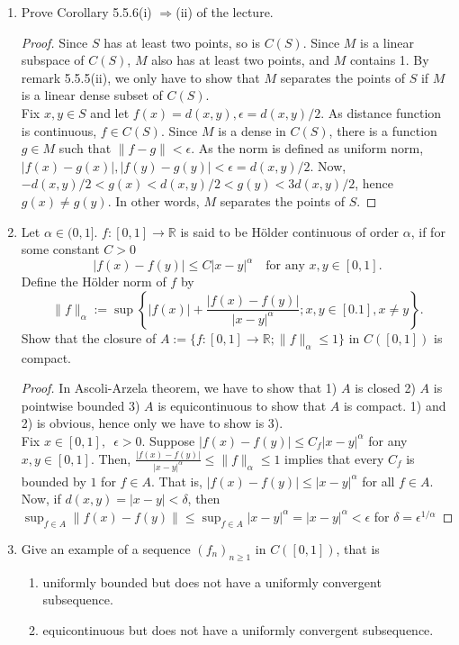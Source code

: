 \documentclass{article}
\begin{document}
\begin{enumerate}[font = \Large\bfseries\itshape\space, leftmargin = 3mm, labelsep = 3mm]
\item
Prove Corollary 5.5.6(i) $\Rightarrow$(ii) of the lecture.
\begin{proof}
Since $S$ has at least two points, so is $C(S)$.
Since $M$ is a linear subspace of $C(S)$, $M$ also has at least two points, and $M$ contains 1.
By remark 5.5.5(ii), we only have to show that $M$ separates the points of $S$ if $M$ is a linear dense subset of $C(S)$.\\
Fix $x,y \in S$ and let $f(x) = d(x,y), \epsilon = d(x,y)/2$.
As distance function is continuous, $f \in C(S)$.
Since $M$ is a dense in $C(S)$, there is a function $g \in M$ such that $\|f-g\| < \epsilon$.
As the norm is defined as uniform norm, $|f(x) - g(x)|, |f(y) - g(y)| < \epsilon = d(x,y) /2$.
Now, $-d(x,y)/2 < g(x) < d(x,y)/2 < g(y) < 3d(x,y)/2$, hence $g(x) \neq g(y)$.
In other words, $M$ separates the points of $S$.
\end{proof}

\item
Let $\alpha \in (0,1]$.
$f : [0,1] \rightarrow \mathbb{R}$ is said to be H\"older continuous of order $\alpha$, if for some constant $C > 0$
$$|f(x)-f(y)| \leq C|x-y|^\alpha \quad \text{for any } x,y \in [0,1].$$
Define the H\"older norm of $f$ by
$$\|f\|_\alpha := \sup \left\{ |f(x)| + \frac{|f(x)-f(y)|}{|x-y|^\alpha}; x,y \in [0.1], x\neq y \right\}.$$
Show that the closure of $A := \{ f : [0,1] \rightarrow \mathbb{R}; \|f\|_\alpha \leq 1\}$ in $C([0,1])$ is compact.
\begin{proof}
In Ascoli-Arzela theorem, we have to show that 1) $A$ is closed 2) $A$ is pointwise bounded 3) $A$ is equicontinuous to show that $A$ is compact.
1) and 2) is obvious, hence only we have to show is 3).\\
Fix $x \in [0,1],\enspace \epsilon > 0$.
Suppose $|f(x)-f(y)| \leq C_f |x-y|^\alpha$ for any $x,y \in [0,1]$.
Then, $\frac{|f(x)-f(y)|}{|x-y|^\alpha} \leq \|f\|_\alpha \leq 1$ implies that every $C_f$ is bounded by $1$ for $f \in A$.
That is, $|f(x)-f(y)| \leq |x-y|^\alpha$ for all $f \in A$.
Now, if $d(x,y) = |x-y| < \delta$, then $\sup_{f \in A} \|f(x)-f(y)\| \leq \sup_{f \in A}|x-y|^\alpha = |x-y|^\alpha < \epsilon$ for $\delta = \epsilon^{1/\alpha}$
\end{proof}

\item
Give an example of a sequence $(f_n)_{n\geq 1}$ in $C([0,1])$, that is
\begin{enumerate}[label = (\roman*)]
\item uniformly bounded but does not have a uniformly convergent subsequence.
\item equicontinuous but does not have a uniformly convergent subsequence.
\end{enumerate}


\end{enumerate}
\end{document}
